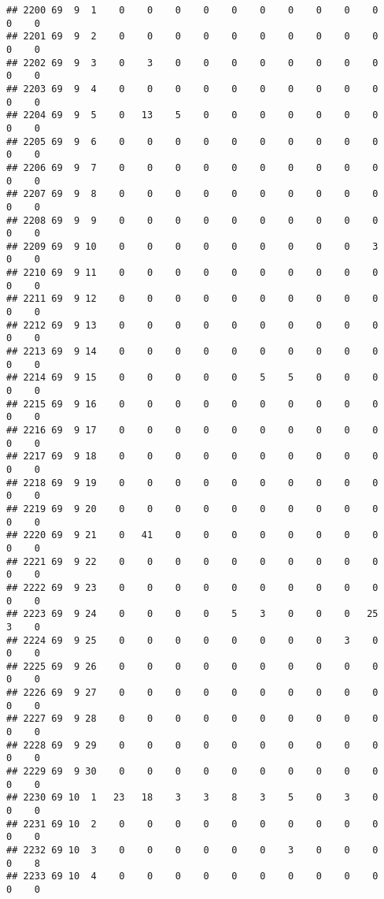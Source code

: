 \documentclass[]{article}
\begin{document}
\begin{verbatim}
## 2200 69  9  1    0    0    0    0    0    0    0    0    0    0    0    0
## 2201 69  9  2    0    0    0    0    0    0    0    0    0    0    0    0
## 2202 69  9  3    0    3    0    0    0    0    0    0    0    0    0    0
## 2203 69  9  4    0    0    0    0    0    0    0    0    0    0    0    0
## 2204 69  9  5    0   13    5    0    0    0    0    0    0    0    0    0
## 2205 69  9  6    0    0    0    0    0    0    0    0    0    0    0    0
## 2206 69  9  7    0    0    0    0    0    0    0    0    0    0    0    0
## 2207 69  9  8    0    0    0    0    0    0    0    0    0    0    0    0
## 2208 69  9  9    0    0    0    0    0    0    0    0    0    0    0    0
## 2209 69  9 10    0    0    0    0    0    0    0    0    0    3    0    0
## 2210 69  9 11    0    0    0    0    0    0    0    0    0    0    0    0
## 2211 69  9 12    0    0    0    0    0    0    0    0    0    0    0    0
## 2212 69  9 13    0    0    0    0    0    0    0    0    0    0    0    0
## 2213 69  9 14    0    0    0    0    0    0    0    0    0    0    0    0
## 2214 69  9 15    0    0    0    0    0    5    5    0    0    0    0    0
## 2215 69  9 16    0    0    0    0    0    0    0    0    0    0    0    0
## 2216 69  9 17    0    0    0    0    0    0    0    0    0    0    0    0
## 2217 69  9 18    0    0    0    0    0    0    0    0    0    0    0    0
## 2218 69  9 19    0    0    0    0    0    0    0    0    0    0    0    0
## 2219 69  9 20    0    0    0    0    0    0    0    0    0    0    0    0
## 2220 69  9 21    0   41    0    0    0    0    0    0    0    0    0    0
## 2221 69  9 22    0    0    0    0    0    0    0    0    0    0    0    0
## 2222 69  9 23    0    0    0    0    0    0    0    0    0    0    0    0
## 2223 69  9 24    0    0    0    0    5    3    0    0    0   25    3    0
## 2224 69  9 25    0    0    0    0    0    0    0    0    3    0    0    0
## 2225 69  9 26    0    0    0    0    0    0    0    0    0    0    0    0
## 2226 69  9 27    0    0    0    0    0    0    0    0    0    0    0    0
## 2227 69  9 28    0    0    0    0    0    0    0    0    0    0    0    0
## 2228 69  9 29    0    0    0    0    0    0    0    0    0    0    0    0
## 2229 69  9 30    0    0    0    0    0    0    0    0    0    0    0    0
## 2230 69 10  1   23   18    3    3    8    3    5    0    3    0    0    0
## 2231 69 10  2    0    0    0    0    0    0    0    0    0    0    0    0
## 2232 69 10  3    0    0    0    0    0    0    3    0    0    0    0    8
## 2233 69 10  4    0    0    0    0    0    0    0    0    0    0    0    0

\end{verbatim}
\end{document}
